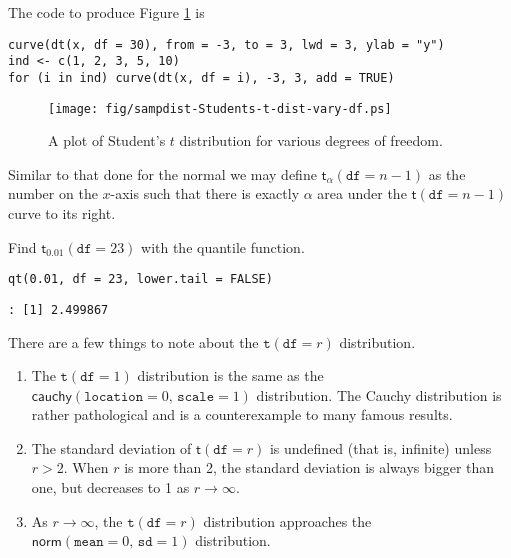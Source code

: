 The code to produce Figure \ref{fig-Students-t-dist-vary-df} is

\begin{verbatim}
curve(dt(x, df = 30), from = -3, to = 3, lwd = 3, ylab = "y")
ind <- c(1, 2, 3, 5, 10)
for (i in ind) curve(dt(x, df = i), -3, 3, add = TRUE)
\end{verbatim}

\begin{figure}[ht!]
\centering
\texttt{[image: fig/sampdist-Students-t-dist-vary-df.ps]}
\caption[Student's \(t\) distribution for various degrees of freedom]{\label{fig-Students-t-dist-vary-df}\small A plot of Student's \(t\) distribution for various degrees of freedom.}
\end{figure}

Similar to that done for the normal we may define
\(\mathsf{t}_{\alpha}(\mathtt{df}=n-1)\) as the number on the
\(x\)-axis such that there is exactly \(\alpha\) area under the
\(\mathsf{t}(\mathtt{df}=n-1)\) curve to its right.


Find \(\mathsf{t}{}_{0.01}(\mathtt{df}=23)\) with the quantile
function.

\begin{verbatim}
qt(0.01, df = 23, lower.tail = FALSE)
\end{verbatim}

\begin{verbatim}
: [1] 2.499867
\end{verbatim}

\begin{rem}
There are a few things to note about the \(\mathtt{t}(\mathtt{df}=r)\)
distribution.
\begin{enumerate}
\item The \(\mathtt{t}(\mathtt{df}=1)\) distribution is the same as the
\(\mathsf{cauchy}(\mathtt{location}=0,\,\mathtt{scale}=1)\)
distribution. The Cauchy distribution is rather pathological and is
a counterexample to many famous results.
\item The standard deviation of \(\mathsf{t}(\mathtt{df}=r)\) is
undefined (that is, infinite) unless \(r>2\). When \(r\) is more
than 2, the standard deviation is always bigger than one, but
decreases to 1 as \(r\to\infty\).
\item As \(r\to\infty\), the \(\mathtt{t}(\mathtt{df}=r)\) distribution
approaches the \(\mathsf{norm}(\mathtt{mean}=0,\,\mathtt{sd}=1)\)
distribution.
\end{enumerate}
\end{rem}

